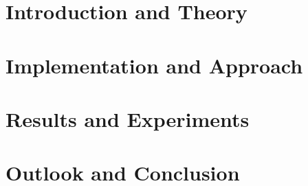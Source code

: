\documentclass[11pt,a4paper,biblography=totoc,index=totoc,headsepline,footsepline,footinlcude=false,BCOR12mm,DIV13]{scrbook}
\begin{document}
 \frontmatter



%
%	


%	

 

 

 
 

 


 \tableofcontents

 

 \mainmatter


	 \part[Introduction and Theory]{Introduction and Theory}
	 \label{part:introAndBackgroundTheory}
	 
	 



	 \part[Implementation and Approach]{Implementation and Approach}
   
	 \label{part:secondP}

	 \part[Results and Experiments]{Results and Experiments}
   
	 \label{part:thirdP}

	 \part[Outlook and Conclusion]{Outlook and Conclusion}
   
	 \label{part:fourthP}
\end{document}
